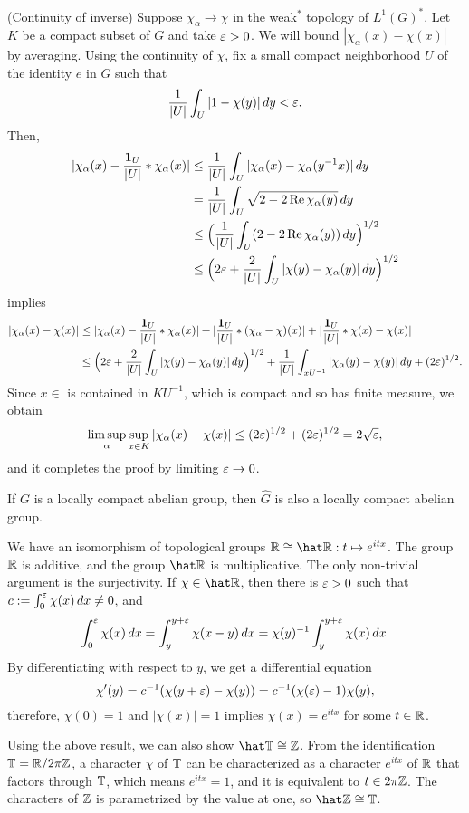 \documentclass[a4paper]{article}
\begin{document}
\begin{pf}
(Continuity of inverse)
Suppose $\chi_\alpha\to\chi$ in the weak$^*$ topology of $L^1(G)^*$.
Let $K$ be a compact subset of $G$ and take $\varepsilon>0$.
We will bound $|\chi_\alpha(x)-\chi(x)|$ by averaging.
Using the continuity of $\chi$, fix a small compact neighborhood $U$ of the identity $e$ in $G$ such that
\[\frac1{|U|}\int_U|1-\chi(y)|\,dy<\varepsilon.\]
Then,
\begin{align*}
|\chi_\alpha(x)-\frac{\mathbf{1}_U}{|U|}*\chi_\alpha(x)|
&\le\frac1{|U|}\int_U|\chi_\alpha(x)-\chi_\alpha(y^{-1}x)|\,dy\\
&=\frac1{|U|}\int_U\sqrt{2-2\operatorname{Re} \chi_\alpha(y)}\,dy\\
&\le\Bigl(\frac1{|U|}\int_U(2-2\operatorname{Re}\chi_\alpha(y))\,dy\Bigr)^{1/2}\\
&\le\Bigl(2\varepsilon+\frac2{|U|}\int_U|\chi(y)-\chi_\alpha(y)|\,dy\Bigr)^{1/2}
\end{align*}
implies
\begin{align*}
|\chi_\alpha(x)-\chi(x)|
&\le|\chi_\alpha(x)-\frac{\mathbf{1}_U}{|U|}*\chi_\alpha(x)|+|\frac{\mathbf{1}_U}{|U|}*(\chi_\alpha-\chi)(x)|+|\frac{\mathbf{1}_U}{|U|}*\chi(x)-\chi(x)|\\
&\le\Bigl(2\varepsilon+\frac2{|U|}\int_U|\chi(y)-\chi_\alpha(y)|\,dy\Bigr)^{1/2}+\frac1{|U|}\int_{xU^{-1}}|\chi_\alpha(y)-\chi(y)|\,dy+(2\varepsilon)^{1/2}.
\end{align*}
Since $x\in$ is contained in $KU^{-1}$, which is compact and so has finite measure, we obtain
\[\limsup_\alpha\sup_{x\in K}|\chi_\alpha(x)-\chi(x)|\le(2\varepsilon)^{1/2}+(2\varepsilon)^{1/2}=2\sqrt{\varepsilon},\]
and it completes the proof by limiting $\varepsilon\to0$.
\end{pf}
\begin{cor}
If $G$ is a locally compact abelian group, then $\hat G$ is also a locally compact abelian group.
\end{cor}

\begin{ex}
We have an isomorphism of topological groups $\R\cong\hat\R:t\mapsto e^{itx}$.
The group $\mathbb{R}$ is additive, and the group $\hat\R$ is multiplicative.
The only non-trivial argument is the surjectivity.
If $\chi\in\hat\R$, then there is $\varepsilon>0$ such that $c:=\int_0^\varepsilon\chi(x)\,dx\ne0$, and
\[\int_0^\varepsilon\chi(x)\,dx=\int_y^{y+\varepsilon}\chi(x-y)\,dx=\chi(y)^{-1}\int_y^{y+\varepsilon}\chi(x)\,dx.\]
By differentiating with respect to $y$, we get a differential equation
\[\chi'(y)=c^{-1}(\chi(y+\varepsilon)-\chi(y))=c^{-1}(\chi(\varepsilon)-1)\chi(y),\]
therefore, $\chi(0)=1$ and $|\chi(x)|=1$ implies $\chi(x)=e^{itx}$ for some $t\in\mathbb{R}$.
\end{ex}
\begin{ex}
Using the above result, we can also show $\hat\T\cong\Z$.
From the identification $\mathbb{T}=\mathbb{R}/2\pi\mathbb{Z}$, a character $\chi$ of $\mathbb{T}$ can be characterized as a character $e^{itx}$ of $\mathbb{R}$ that factors through $\mathbb{T}$, which means $e^{itx}=1$, and it is equivalent to $t\in2\pi\mathbb{Z}$.
The characters of $\mathbb{Z}$ is parametrized by the value at one, so $\hat\Z\cong\T$.
\end{ex}
\end{document}
